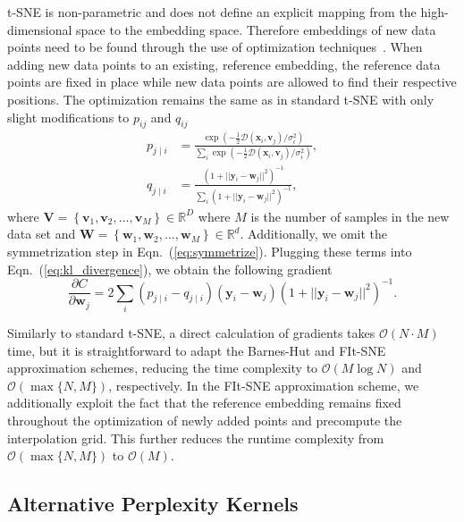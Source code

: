 \documentclass[letter]{article}
\begin{document}
t-SNE is non-parametric and does not define an explicit mapping from the
high-dimensional space to the embedding space. Therefore embeddings of new data
points need to be found through the use of optimization
techniques~\cite{policar2019embedding}. When adding new data points to an
existing, reference embedding, the reference data points are fixed in place
while new data points are allowed to find their respective positions. The
optimization remains the same as in standard t-SNE with only slight
modifications to $p_{ij}$ and $q_{ij}$
\begin{align}
p_{j \mid i} &= \frac{\exp \left ( -\frac{1}{2} \mathcal{D}(\mathbf{x}_i, \mathbf{v}_j) /  \sigma_i^2 \right )}{\sum_{i} \exp \left ( -\frac{1}{2} \mathcal{D}(\mathbf{x}_i, \mathbf{v}_j) / \sigma_i^2 \right )}, \\
q_{j \mid i} &= \frac{\left ( 1 + || \mathbf{y}_i - \mathbf{w}_j ||^2 \right )^{-1}}{\sum_{i}\left ( 1 + || \mathbf{y}_i - \mathbf{w}_j ||^2 \right )^{-1}},
\end{align}
\noindent where $\mathbf{V} = \left \{ \mathbf{v}_1, \mathbf{v}_2, \dots,
\mathbf{v}_M \right \} \in \mathbb{R}^D$ where $M$ is the number of samples in
the new data set and $\mathbf{W} = \left \{ \mathbf{w}_1, \mathbf{w}_2, \dots,
\mathbf{w}_M \right \} \in \mathbb{R}^d$. Additionally, we omit the
symmetrization step in Eqn.~(\ref{eq:symmetrize}). Plugging these terms into
Eqn.~(\ref{eq:kl_divergence}), we obtain the following gradient
\begin{equation}
\frac{\partial C}{\partial \mathbf{w}_j} = 2 \sum_i \left ( p_{j \mid i} - q_{j \mid i} \right ) \left ( \mathbf{y}_i - \mathbf{w}_j \right ) \left ( 1 + || \mathbf{y}_i - \mathbf{w}_j || ^2 \right )^{-1}.
\label{eq:gradient}
\end{equation}

Similarly to standard t-SNE, a direct calculation of gradients takes
$\mathcal{O}(N \cdot M)$ time, but it is straightforward to adapt the Barnes-Hut
and FIt-SNE approximation schemes, reducing the time complexity to
$\mathcal{O}(M \log N)$ and $\mathcal{O}(\max \{ N, M \})$, respectively. In the
FIt-SNE approximation scheme, we additionally exploit the fact that the
reference embedding remains fixed throughout the optimization of newly added
points and precompute the interpolation grid. This further reduces the runtime
complexity from $\mathcal{O}(\max \{ N, M \})$ to $\mathcal{O}(M)$.

\subsection*{Alternative Perplexity Kernels}
\end{document}
